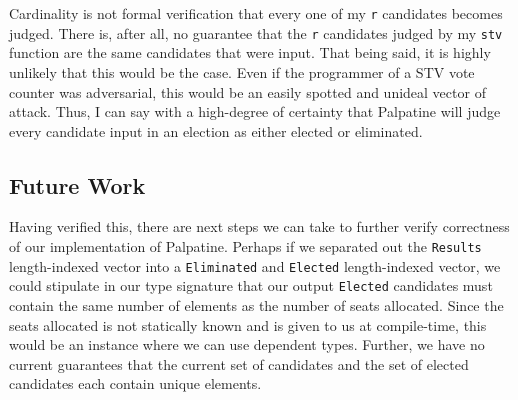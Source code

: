 Cardinality is not formal verification that every one of my \texttt{r}
candidates becomes judged. There is, after all, no guarantee that the \texttt{r}
candidates judged by my \texttt{stv} function are the same candidates that were
input. That being said, it is highly unlikely that this would be the case. Even
if the programmer of a STV vote counter was adversarial, this would be an easily
spotted and unideal vector of attack. Thus, I can say with a high-degree of
certainty that Palpatine will judge every candidate input in an election as
either elected or eliminated. 

\subsection{Future Work}

Having verified this, there are next steps we can take to further verify
correctness of our implementation of Palpatine. Perhaps if we separated out the
\texttt{Results} length-indexed vector into a \texttt{Eliminated} and
\texttt{Elected} length-indexed vector, we could stipulate in our type signature
that our output \texttt{Elected} candidates must contain the same number of
elements as the number of seats allocated. Since the seats allocated is not
statically known and is given to us at compile-time, this would be an instance
where we can use dependent types. Further, we have no current guarantees that
the current set of candidates and the set of elected candidates each contain
unique elements. 